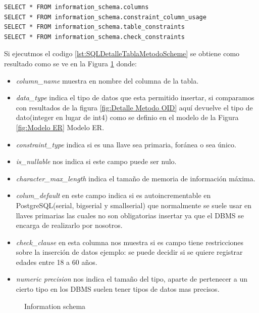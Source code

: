 \lstset{language=sql,breaklines=true}
\begin{lstlisting}
SELECT * FROM information_schema.columns
SELECT * FROM information_schema.constraint_column_usage
SELECT * FROM information_schema.table_constraints
SELECT * FROM information_schema.check_constraints
\end{lstlisting}
Si ejecutmos el codigo \ref{lst:SQLDetalleTablaMetodoScheme} se obtiene como resultado como se ve en la Figura \ref{fig:DetalleMetodoScheme} donde:
\begin{itemize}
\item \emph{column\_name} muestra en nombre del columna de la tabla.
\item \emph{data\_type} indica el tipo de datos que esta permitido insertar, si comparamos con resultados de la figura \ref{fig:Detalle Metodo OID} aqu\'i devuelve el tipo de dato(integer en lugar de int4) como se definio en el modelo de la Figura \ref{fig:Modelo ER} Modelo ER.
\item \emph{constraint\_type} indica si es una llave sea primaria, for\'anea o sea \'unico.
\item \emph{is\_nullable} nos indica si este campo puede ser nulo.
\item \emph{character\_max\_length} indica el tama\~no de memoria de informaci\'on m\'axima.
\item \emph{colum\_default} en este campo indica si es autoincrementable en PostgreSQL(serial, bigserial y smallserial) que normalmente se suele usar en llaves primarias las cuales no son obligatorias insertar ya que el DBMS se encarga de realizarlo por nosotros.
\item \emph{check\_clause} en esta columna nos muestra si es campo tiene restricciones sobre la inserci\'on de datos ejemplo: se puede decidir si se quiere registrar edades entre 18 a 60 a\~nos. 
\item \emph{numeric precision} nos indica el tama\~no del tipo, aparte de pertenecer a un cierto tipo en los DBMS suelen tener tipos de datos mas precisos.  
\end{itemize}

\begin{figure}[H]
\centering
{}
\caption{Information schema} \label{fig:DetalleMetodoScheme}
\end{figure}
